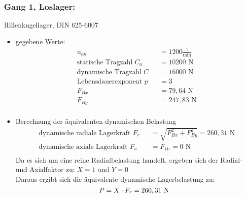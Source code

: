 \subsubsection{Gang 1, Loslager:} Rillenkugellager, DIN 625-6007\\
\begin{itemize}
	\item gegebene Werte:
	\begin{align*}
	&n_{an}&&= 1200 \frac{1}{\text{min}} \\
	&\text{statische Tragzahl } C_0 &&= 10200 \text{ N}\\
	&\text{dynamische Tragzahl } C &&= 16000 \text{ N} \\
	&\text{Lebensdauerexponent } p&&= 3  \\
	&F_{Bx} && = 79,64 \text{ N}\\
	&F_{By} && = 247,83 \text{ N}\\
	\end{align*} 
	\item Berechnung der äquivalenten dynamischen Belastung
	\begin{align*}
	&\text{dynamische radiale Lagerkraft } F_r&& = \sqrt{F_{Bx}^2 + F_{By}^2 } = 260,31 \text{ N} \\
	&\text{dynamische axiale Lagerkraft } F_a&& = F_{Bz} = 0\text{ N}\\
	\end{align*} 
	Da es sich um eine reine Radialbelastung handelt, ergeben sich der Radial- und Axialfaktor zu: $X= 1$ und $Y=0$\\
	Daraus ergibt sich die äquivalente dynamische Lagerbelastung zu:  
	\[
	P= X \cdot F_r =260,31 \text{ N}
	\]
\end{itemize}
\newpage

